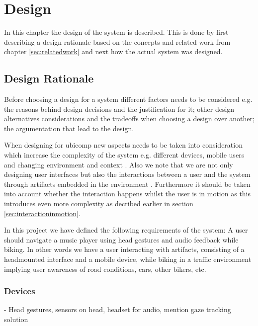 \chapter{Design}
In this chapter the design of the system is described. This is done by first describing a design rationale based on the concepts and related work from chapter \ref{sec:relatedwork} and next how the actual system was designed.

\section{Design Rationale}


Before choosing a design for a system different factors needs to be considered e.g. the reasons behind design decisions and the justification for it; other design alternatives considerations and the tradeoffs when choosing a design over another; the argumentation that lead to the design.

When designing for ubicomp new aspects needs to be taken into consideration which increase the complexity of the system e.g. different devices, mobile users and changing environment and context \cite{barfield_fundamentals_2000}. Also we note that we are not only designing user interfaces but also the interactions between a user and the system through artifacts embedded in the environment \cite{beaudouin-lafon_designing_2004}. Furthermore it should be taken into account whether the interaction happens whilst the user is in motion as this introduces even more complexity as decribed earlier in section \ref{sec:interactioninmotion}.

In this project we have defined the following requirements of the system: A user should navigate a music player using head gestures and audio feedback while biking. In other words we have a user interacting with artifacts, consisting of a headmounted interface and a mobile device, while biking in a traffic environment implying user awareness of road conditions, cars, other bikers, etc.

\subsection{Devices}
- Head gestures, sensors on head, headset for audio, mention gaze tracking solution

